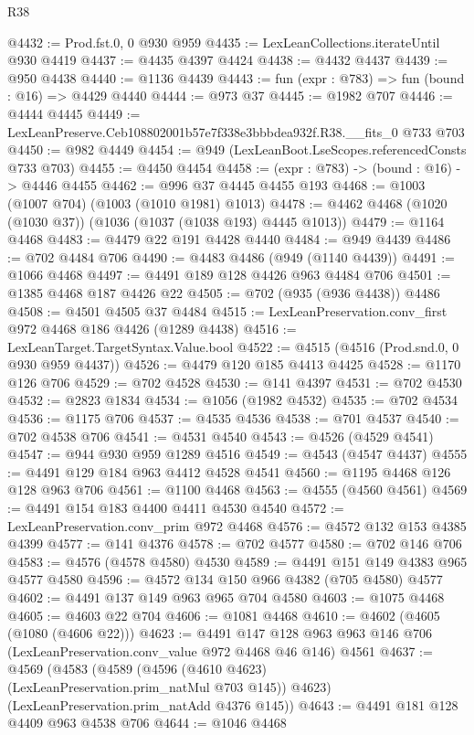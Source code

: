 \begin{lexlean}{R38}
\begin{coremodule}
@4432 := Prod.fst.{0, 0} @930 @959
@4435 := LexLeanCollections.iterateUntil @930 @4419
@4437 := @4435 @4397 @4424
@4438 := @4432 @4437
@4439 := @950 @4438
@4440 := @1136 @4439
@4443 := fun (expr : @783) => fun (bound : @16) => @4429 @4440
@4444 := @973 @37
@4445 := @1982 @707
@4446 := @4444 @4445
@4449 := LexLeanPreserve.Ceb108802001b57e7f338e3bbbdea932f.R38.__fits_0 @733 @703
@4450 := @982 @4449
@4454 := @949 (LexLeanBoot.LseScopes.referencedConsts @733 @703)
@4455 := @4450 @4454
@4458 := (expr : @783) -> (bound : @16) -> @4446 @4455
@4462 := @996 @37 @4445 @4455 @193
@4468 := @1003 (@1007 @704) (@1003 (@1010 @1981) @1013)
@4478 := @4462 @4468 (@1020 (@1030 @37)) (@1036 (@1037 (@1038 @193) @4445 @1013))
@4479 := @1164 @4468
@4483 := @4479 @22 @191 @4428 @4440
@4484 := @949 @4439
@4486 := @702 @4484 @706
@4490 := @4483 @4486 (@949 (@1140 @4439))
@4491 := @1066 @4468
@4497 := @4491 @189 @128 @4426 @963 @4484 @706
@4501 := @1385 @4468 @187 @4426 @22
@4505 := @702 (@935 (@936 @4438)) @4486
@4508 := @4501 @4505 @37 @4484
@4515 := LexLeanPreservation.conv_first @972 @4468 @186 @4426 (@1289 @4438)
@4516 := LexLeanTarget.TargetSyntax.Value.bool
@4522 := @4515 (@4516 (Prod.snd.{0, 0} @930 @959 @4437))
@4526 := @4479 @120 @185 @4413 @4425
@4528 := @1170 @126 @706
@4529 := @702 @4528
@4530 := @141 @4397
@4531 := @702 @4530
@4532 := @2823 @1834
@4534 := @1056 (@1982 @4532)
@4535 := @702 @4534
@4536 := @1175 @706
@4537 := @4535 @4536
@4538 := @701 @4537
@4540 := @702 @4538 @706
@4541 := @4531 @4540
@4543 := @4526 (@4529 @4541)
@4547 := @944 @930 @959 @1289 @4516
@4549 := @4543 (@4547 @4437)
@4555 := @4491 @129 @184 @963 @4412 @4528 @4541
@4560 := @1195 @4468 @126 @128 @963 @706
@4561 := @1100 @4468
@4563 := @4555 (@4560 @4561)
@4569 := @4491 @154 @183 @4400 @4411 @4530 @4540
@4572 := LexLeanPreservation.conv_prim @972 @4468
@4576 := @4572 @132 @153 @4385 @4399
@4577 := @141 @4376
@4578 := @702 @4577
@4580 := @702 @146 @706
@4583 := @4576 (@4578 @4580) @4530
@4589 := @4491 @151 @149 @4383 @965 @4577 @4580
@4596 := @4572 @134 @150 @966 @4382 (@705 @4580) @4577
@4602 := @4491 @137 @149 @963 @965 @704 @4580
@4603 := @1075 @4468
@4605 := @4603 @22 @704
@4606 := @1081 @4468
@4610 := @4602 (@4605 (@1080 (@4606 @22)))
@4623 := @4491
    @147
    @128
    @963
    @963
    @146
    @706
    (LexLeanPreservation.conv_value @972 @4468 @46 @146)
    @4561
@4637 := @4569
    (@4583
      (@4589 (@4596 (@4610 @4623) (LexLeanPreservation.prim_natMul @703 @145)) @4623)
      (LexLeanPreservation.prim_natAdd @4376 @145))
@4643 := @4491 @181 @128 @4409 @963 @4538 @706
@4644 := @1046 @4468

\end{coremodule}
\end{lexlean}
